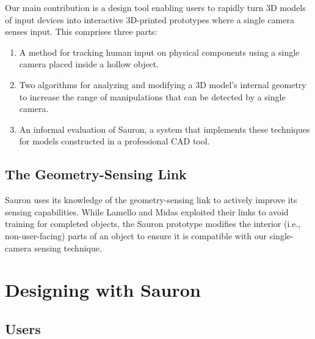 Our main contribution is a design tool enabling users to rapidly turn 3D models of input devices into interactive 3D-printed prototypes where a single camera senses input. This comprises three parts:

\begin{enumerate}
\item A method for tracking human input on physical components using a single camera placed inside a hollow object.
\item Two algorithms for analyzing and modifying a 3D model's internal geometry to increase the range of manipulations that can be detected by a single camera.
\item An informal evaluation of Sauron, a system that implements these techniques for models constructed in a professional CAD tool.
\end{enumerate}


    \subsection{The Geometry-Sensing Link}
    Sauron uses its knowledge of the geometry-sensing link to actively improve its sensing capabilities. While Lamello and Midas exploited their links to avoid training for completed objects, the Sauron prototype modifies the interior (i.e., non-user-facing) parts of an object to ensure it is compatible with our single-camera sensing technique.

\section{Designing with Sauron}

    \subsection{Users}
    
